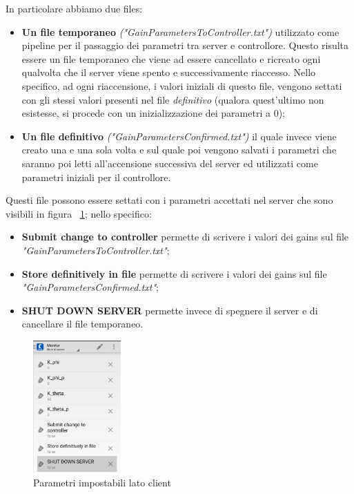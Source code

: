 In particolare abbiamo due files:
\begin{itemize}
	\item \textbf{Un file temporaneo} \textit{("GainParametersToController.txt")} utilizzato come pipeline per il passaggio dei parametri tra server e controllore. Questo risulta essere un file temporaneo che viene ad essere cancellato e ricreato ogni qualvolta che il server viene spento e successivamente riaccesso.
	Nello specifico, ad ogni riaccensione, i valori iniziali di questo file, vengono settati con gli stessi valori presenti nel file \textit{definitivo}  (qualora quest'ultimo non esistesse, si procede con un inizializzazione dei parametri a 0);
	
	\item \textbf{Un file definitivo} \textit{("GainParametersConfirmed.txt")} il quale invece viene creato una e una sola volta e sul quale poi vengono salvati i parametri che saranno poi letti all'accensione successiva del server ed utilizzati come parametri iniziali per il controllore.
\end{itemize}

Questi file possono essere settati con i parametri accettati nel server che sono visibili in figura ~\ref{fig:OPCUA_params}; nello specifico:
\begin{itemize}
	\item \textbf{Submit change to controller} permette di scrivere i valori dei gains sul file \textit{"GainParametersToController.txt"};
	
	\item \textbf{Store definitively in file} permette di scrivere i valori dei gains sul file \textit{"GainParametersConfirmed.txt"};
	
	\item \textbf{SHUT DOWN SERVER} permette invece di spegnere il server e di cancellare il file temporaneo.
\end{itemize}

\begin{figure}[h!]
	\centering   	
	\includegraphics[width=0.3\textwidth]{Immagini/OPC_UA_params.jpg}
	\caption{Parametri impostabili lato client}
	\label{fig:OPCUA_params}
\end{figure}


